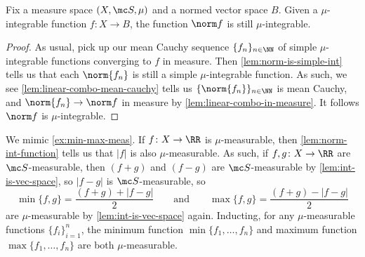 \documentclass[../notes.tex]{subfiles}
\begin{document}
\begin{lemma} \label{lem:norm-int-function}
	Fix a measure space $(X,\mc S,\mu)$ and a normed vector space $B$. Given a $\mu$-integrable function $f\colon X\to B$, the function $\norm f$ is still $\mu$-integrable.
\end{lemma}
\begin{proof}
	As usual, pick up our mean Cauchy sequence $\{f_n\}_{n\in\NN}$ of simple $\mu$-integrable functions converging to $f$ in measure. Then \autoref{lem:norm-is-simple-int} tells us that each $\norm{f_n}$ is still a simple $\mu$-integrable function. As such, we see \autoref{lem:linear-combo-mean-cauchy} tells us $\{\norm{f_n}\}_{n\in\NN}$ is mean Cauchy, and $\norm{f_n}\to\norm f$ in measure by \autoref{lem:linear-combo-in-measure}. It follows $\norm f$ is $\mu$-integrable.
\end{proof}
\begin{example} \label{ex:min-max-int}
	We mimic \autoref{ex:min-max-meas}. If $f\colon X\to\RR$ is $\mu$-measurable, then \autoref{lem:norm-int-function} tells us that $|f|$ is also $\mu$-measurable. As such, if $f,g\colon X\to\RR$ are $\mc S$-measurable, then $(f+g)$ and $(f-g)$ are $\mc S$-measurable by \autoref{lem:int-is-vec-space}, so $|f-g|$ is $\mc S$-measurable, so
	\[\min\{f,g\}=\frac{(f+g)+|f-g|}2\qquad\text{and}\qquad\max\{f,g\}=\frac{(f+g)-|f-g|}2\]
	are $\mu$-measurable by \autoref{lem:int-is-vec-space} again. Inducting, for any $\mu$-measurable functions $\{f_i\}_{i=1}^n$, the minimum function $\min\{f_1,\ldots,f_n\}$ and maximum function $\max\{f_1,\ldots,f_n\}$ are both $\mu$-measurable.
\end{example}
\end{document}
